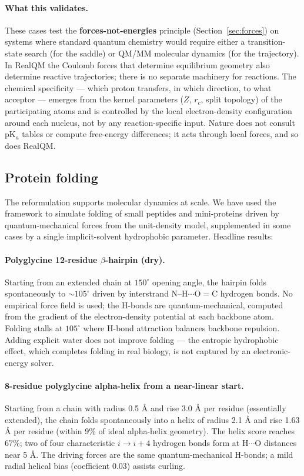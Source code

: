 \documentclass[11pt]{article}
\begin{document}
\paragraph{What this validates.}
These cases test the \textbf{forces-not-energies} principle (Section~\ref{sec:forces}) on systems where standard quantum chemistry would require either a transition-state search (for the saddle) or QM/MM molecular dynamics (for the trajectory). In RealQM the Coulomb forces that determine equilibrium geometry also determine reactive trajectories; there is no separate machinery for reactions. The chemical specificity --- which proton transfers, in which direction, to what acceptor --- emerges from the kernel parameters ($Z$, $r_c$, split topology) of the participating atoms and is controlled by the local electron-density configuration around each nucleus, not by any reaction-specific input. Nature does not consult pK$_a$ tables or compute free-energy differences; it acts through local forces, and so does RealQM.

\subsection{Protein folding}\label{sec:proteins}

The reformulation supports molecular dynamics at scale. We have used the framework to simulate folding of small peptides and mini-proteins driven by quantum-mechanical forces from the unit-density model, supplemented in some cases by a single implicit-solvent hydrophobic parameter. Headline results:

\paragraph{Polyglycine 12-residue $\beta$-hairpin (dry).}
Starting from an extended chain at $150^\circ$ opening angle, the hairpin folds spontaneously to ${\sim}105^\circ$ driven by interstrand N--H$\cdots$O$=$C hydrogen bonds. No empirical force field is used; the H-bonds are quantum-mechanical, computed from the gradient of the electron-density potential at each backbone atom. Folding stalls at $105^\circ$ where H-bond attraction balances backbone repulsion. Adding explicit water does not improve folding --- the entropic hydrophobic effect, which completes folding in real biology, is not captured by an electronic-energy solver.

\paragraph{8-residue polyglycine alpha-helix from a near-linear start.}
Starting from a chain with radius 0.5 \AA{} and rise 3.0 \AA{} per residue (essentially extended), the chain folds spontaneously into a helix of radius 2.1 \AA{} and rise 1.63 \AA{} per residue (within 9\% of ideal alpha-helix geometry). The helix score reaches 67\%; two of four characteristic $i \to i{+}4$ hydrogen bonds form at H$\cdots$O distances near 5 \AA. The driving forces are the same quantum-mechanical H-bonds; a mild radial helical bias (coefficient 0.03) assists curling.
\end{document}
